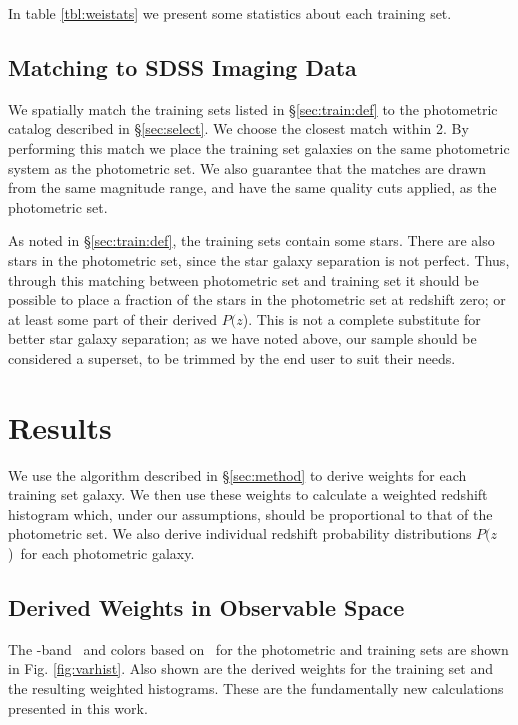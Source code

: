 \documentclass[preprint]{aastex}
\newcommand{\pofz}{$P(z$)}
\newcommand{\matchrad}{2\arcsec}
\begin{document}
In table \ref{tbl:weistats} we present some statistics about each training set.


\subsection{Matching to SDSS Imaging Data} \label{sec:train:match}

We spatially match the training sets listed in \S \ref{sec:train:def} to the
photometric catalog described in \S \ref{sec:select}.  We choose the closest
match within \matchrad.  By performing this match we place the training set
galaxies on the same photometric system as the photometric set.  We also
guarantee that the matches are drawn from the same magnitude range, and have
the same quality cuts applied, as the photometric set.

As noted in \S \ref{sec:train:def}, the training sets contain some stars.
There are also stars in the photometric set, since the star galaxy separation
is not perfect.  Thus, through this matching between photometric set and
training set it should be possible to place a fraction of the stars in the
photometric set at redshift zero; or at least some part of their derived \pofz.
This is not a complete substitute for better star galaxy separation; as we
have noted above, our sample should be considered a superset, to be
trimmed by the end user to suit their needs.

\section{Results} \label{sec:results}

We use the algorithm described in \S \ref{sec:method} to derive weights for
each training set galaxy.  We then use these weights to calculate a weighted
redshift histogram which, under our assumptions, should be proportional to that
of the photometric set.  We also derive individual redshift probability
distributions \pofz\ for each photometric galaxy.

\subsection{Derived Weights in Observable Space}

The \rmag-band \cmodelmag\ and colors based on \modelmag\ for the photometric
and training sets are shown in Fig. \ref{fig:varhist}.  Also shown are the
derived weights for the training set and the resulting weighted histograms.
These are the fundamentally new calculations presented in this work.
\end{document}
